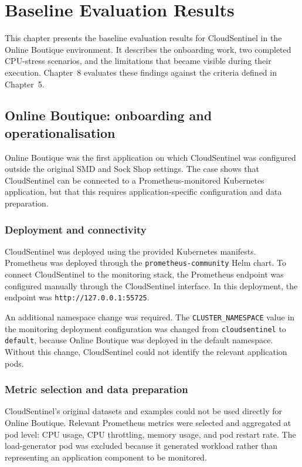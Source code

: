 \chapter{Baseline Evaluation Results}
\label{ch:baseline_evaluation_results}
This chapter presents the baseline evaluation results for CloudSentinel in the Online Boutique environment. It describes the onboarding work, two completed CPU-stress scenarios, and the limitations that became visible during their execution. Chapter~8 evaluates these findings against the criteria defined in Chapter~5.

\section{Online Boutique: onboarding and operationalisation}
Online Boutique was the first application on which CloudSentinel was configured outside the original SMD and Sock Shop settings. The case shows that CloudSentinel can be connected to a Prometheus-monitored Kubernetes application, but that this requires application-specific configuration and data preparation.

\subsection{Deployment and connectivity}
CloudSentinel was deployed using the provided Kubernetes manifests. Prometheus was deployed through the \texttt{prometheus-community} Helm chart. To connect CloudSentinel to the monitoring stack, the Prometheus endpoint was configured manually through the CloudSentinel interface. In this deployment, the endpoint was \texttt{http://127.0.0.1:55725}.

An additional namespace change was required. The \texttt{CLUSTER\_NAMESPACE} value in the monitoring deployment configuration was changed from \texttt{cloudsentinel} to \texttt{default}, because Online Boutique was deployed in the default namespace. Without this change, CloudSentinel could not identify the relevant application pods.

\subsection{Metric selection and data preparation}
CloudSentinel's original datasets and examples could not be used directly for Online Boutique. Relevant Prometheus metrics were selected and aggregated at pod level: CPU usage, CPU throttling, memory usage, and pod restart rate. The load-generator pod was excluded because it generated workload rather than representing an application component to be monitored.

